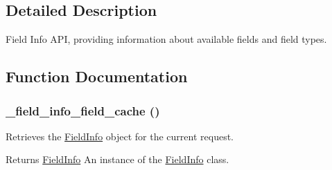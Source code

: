 \subsection{Detailed Description}
Field Info API, providing information about available fields and field types. 

\subsection{Function Documentation}
\hypertarget{field_8info_8inc_ac916c03792bed928c8850585fbc0f433}{
\subsubsection[{\_\-field\_\-info\_\-field\_\-cache}]{\setlength{\rightskip}{0pt plus 5cm}\_\-field\_\-info\_\-field\_\-cache ()}}
\label{field_8info_8inc_ac916c03792bed928c8850585fbc0f433}
Retrieves the \hyperlink{classFieldInfo}{FieldInfo} object for the current request.

\begin{DoxyReturn}{Returns}
\hyperlink{classFieldInfo}{FieldInfo} An instance of the \hyperlink{classFieldInfo}{FieldInfo} class. 
\end{DoxyReturn}
